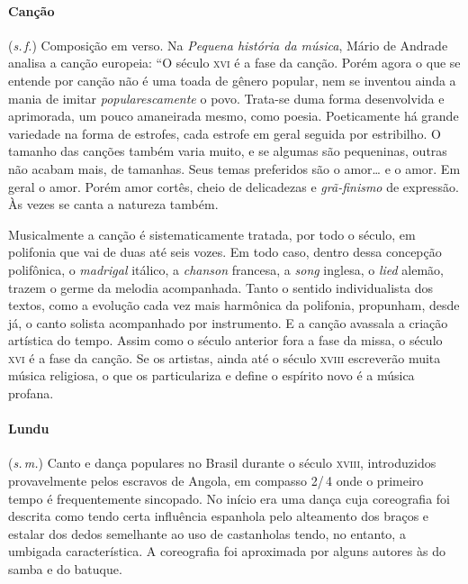 \paragraph{Canção} (\textit{s.\,f.}) Composição em verso. Na \textit{Pequena
história da música}, Mário de Andrade analisa a canção europeia: ``O
século \textsc{xvi} é a fase da canção. Porém agora o que se entende por canção não
é uma toada de gênero popular, nem se inventou ainda a mania de imitar
\textit{popularescamente} o povo. Trata-se duma forma desenvolvida e aprimorada,
um pouco amaneirada mesmo, como poesia. Poeticamente há grande variedade
na forma de estrofes, cada estrofe em geral seguida por estribilho. O
tamanho das canções também varia muito, e se algumas são pequeninas,
outras não acabam mais, de tamanhas. Seus temas preferidos são o
amor\ldots{} e o amor. Em geral o amor. Porém amor cortês, cheio de
delicadezas e \textit{grã-finismo} de expressão. Às vezes se canta a natureza
também.

Musicalmente a canção é sistematicamente tratada, por todo o século,
em polifonia que vai de duas até seis vozes. Em todo caso, dentro dessa
concepção polifônica, o \textit{madrigal} itálico, a \textit{chanson} francesa, a \textit{song}
inglesa, o \textit{lied} alemão, trazem o germe da melodia acompanhada. Tanto o
sentido individualista dos textos, como a evolução cada vez mais
harmônica da polifonia, propunham, desde já, o canto solista acompanhado
por instrumento. E a canção avassala a criação artística do tempo. Assim
como o século anterior fora a fase da missa, o século \textsc{xvi} é a fase da
canção. Se os artistas, ainda até o século \textsc{xviii} escreverão muita música
religiosa, o que os particulariza e define o espírito novo é a música
profana. %


\paragraph{Lundu} (\textit{s.\,m.}) Canto e dança populares no Brasil durante o século
\textsc{xviii}, introduzidos provavelmente pelos escravos de Angola, em compasso
2/\,4 onde o primeiro tempo é frequentemente sincopado. No início era uma
dança cuja coreografia foi descrita como tendo certa influência
espanhola pelo alteamento dos braços e estalar dos dedos semelhante ao
uso de castanholas tendo, no entanto, a umbigada característica. A
coreografia foi aproximada por alguns autores às do samba e do
batuque.

